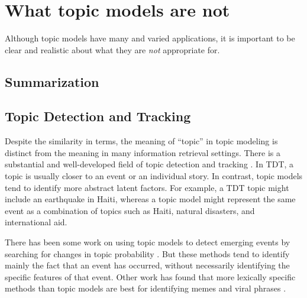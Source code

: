 \chapter{What topic models are not}
\label{ch:boundaries}

Although topic models have many and varied applications, it is important to be clear and realistic about what they are {\em not} appropriate for.


\section{Summarization}



\section{Topic Detection and Tracking}

Despite the similarity in terms, the meaning of ``topic'' in topic modeling is distinct from the meaning in many information retrieval settings.
There is a substantial and well-developed field of topic detection and tracking \cite{allan-02}.
In TDT, a topic is usually closer to an event or an individual story.
In contrast, topic models tend to identify more abstract latent factors.
For example, a TDT topic might include an earthquake in Haiti, whereas a topic model might represent the same event as a combination of topics such as Haiti, natural disasters, and international aid.

There has been some work on using topic models to detect emerging events by searching for changes in topic probability \cite{alsumait-08}.
But these methods tend to identify mainly the fact that an event has occurred, without necessarily identifying the specific features of that event.
Other work has found that more lexically specific methods than topic models are best for identifying memes and viral phrases \cite{leskovec-09}.





